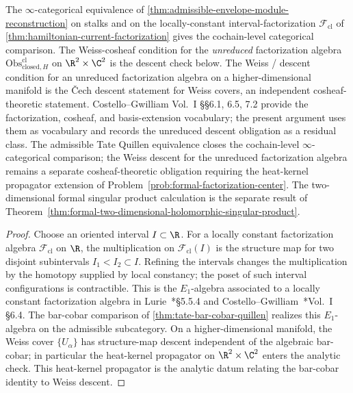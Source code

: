 \begin{prop}
  \label{prop:weiss-cosheaf-residual}
  The $\infty$-categorical equivalence of
  \ref{thm:admissible-envelope-module-reconstruction} on stalks and on
  the locally-constant interval-factorization $\mathcal F_{\mathrm{cl}}$
  of \ref{thm:hamiltonian-current-factorization} gives the cochain-level
  categorical comparison.  The Weiss-cosheaf condition for the
  \emph{unreduced} factorization algebra
  $\mathrm{Obs}^{\mathrm{cl}}_{\mathrm{closed},H}$ on $\R^2\times\C^2$
	  is the descent check below.
  The Weiss / descent condition for an unreduced factorization
	  algebra on a higher-dimensional manifold is the \v{C}ech descent
	  statement for Weiss covers, an independent cosheaf-theoretic
	  statement.  Costello--Gwilliam Vol.~I
	  \S\S 6.1, 6.5, 7.2 provide the factorization, cosheaf, and
	  basis-extension vocabulary; the present argument uses them as
	  vocabulary and records the unreduced descent obligation as a residual
	  class.  The
  admissible Tate
  Quillen equivalence closes the cochain-level
  $\infty$-categorical comparison; the Weiss descent for the unreduced
  factorization algebra remains a separate cosheaf-theoretic
  obligation requiring the heat-kernel propagator extension of
  Problem~\ref{prob:formal-factorization-center}.  The two-dimensional
  formal singular product calculation is the separate result of
  Theorem~\ref{thm:formal-two-dimensional-holomorphic-singular-product}.
\end{prop}

\begin{proof}
  Choose an oriented interval \(I\subset\R\).  For a locally constant
  factorization algebra \(\mathcal F_{\mathrm{cl}}\) on \(\R\), the
  multiplication on \(\mathcal F_{\mathrm{cl}}(I)\) is the structure map
  for two disjoint subintervals \(I_1<I_2\subset I\).  Refining the
  intervals changes the multiplication by the homotopy supplied by local
  constancy; the poset of such interval configurations is contractible.
  This is the \(E_1\)-algebra associated to a locally constant
  factorization algebra in
  Lurie~\cite{lurie-ha}*{\S 5.5.4} and
  Costello--Gwilliam~\cite{costello-gwilliam}*{Vol.~I \S 6.4}.  The
  bar-cobar comparison of \ref{thm:tate-bar-cobar-quillen} realizes this
  \(E_1\)-algebra on the admissible subcategory.  On a
  higher-dimensional manifold, the Weiss
  cover $\{U_\alpha\}$ has structure-map descent independent of
  the algebraic bar-cobar; in particular the heat-kernel
  propagator on $\R^2\times\C^2$ enters the analytic check.
  This heat-kernel propagator is the analytic datum relating the
  bar-cobar identity to Weiss descent.
\end{proof}
